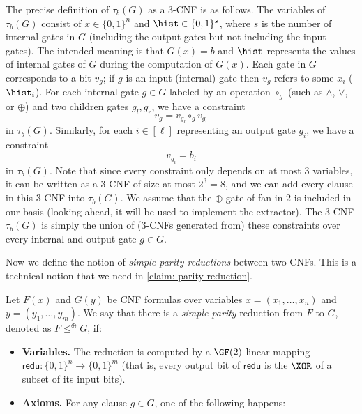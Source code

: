 The precise definition of $\tau_b(G)$ as a $3$-CNF is as follows. The variables of $\tau_b(G)$ consist of $x\in \{0, 1\}^n$ and $\hist \in \{0, 1\}^s$, where $s$ is the number of internal gates in $G$ (including the output gates but not including the input gates). The intended meaning is that $G(x) = b$ and $\hist$ represents the values of internal gates of $G$ during the computation of $G(x)$. Each gate in $G$ corresponds to a bit $v_g$; if $g$ is an input (internal) gate then $v_g$ refers to some $x_i$ ($\hist_i$). For each internal gate $g \in G$ labeled by an operation $\circ_g$ (such as $\land$, $\lor$, or $\oplus$) and two children gates $g_l, g_r$, we have a constraint
\[v_g = v_{g_l} \mathbin{\circ_g} v_{g_r}\]
in $\tau_b(G)$. Similarly, for each $i\in [\ell]$ representing an output gate $g_i$, we have a constraint
\[v_{g_i} = b_i\]
in $\tau_b(G)$. Note that since every constraint only depends on at most $3$ variables, it can be written as a $3$-CNF of size at most $2^3 = 8$, and we can add every clause in this $3$-CNF into $\tau_b(G)$. We assume that the $\oplus$ gate of fan-in $2$ is included in our basis (looking ahead, it will be used to implement the extractor). The $3$-CNF $\tau_b(G)$ is simply the union of ($3$-CNFs generated from) these constraints over every internal and output gate $g \in G$.

Now we define the notion of \emph{simple parity reductions} between two CNFs. This is a technical notion that we need in \autoref{claim: parity reduction}.

\def\redu{\mathsf{redu}}

\begin{definition}\label{def: parity reduction}
    Let $F(x)$ and $G(y)$ be CNF formulas over variables $x = (x_1, \dots, x_n)$ and $y = (y_1, \dots, y_m)$. We say that there is a \emph{simple parity} reduction from $F$ to $G$, denoted as $F\le^\oplus G$, if:
    \begin{itemize}
        \item {\bf Variables.} The reduction is computed by a $\GF(2)$-linear mapping $\redu: \{0, 1\}^n \to \{0, 1\}^m$ (that is, every output bit of $\redu$ is the $\XOR$ of a subset of its input bits).
        \item {\bf Axioms.} For any clause $g\in G$, one of the following happens:
        
        
    \end{itemize}
\end{definition}

